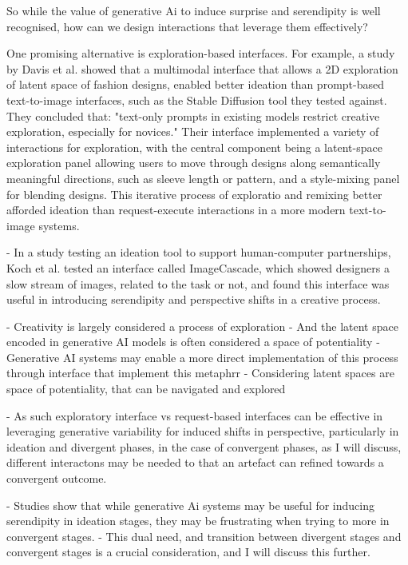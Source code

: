 So while the value of generative Ai to induce surprise and serendipity is well recognised, how can we design interactions that leverage them effectively? 

One promising alternative is exploration-based interfaces. For example, a study by Davis et al. \cite{Davis2024-ml} showed that a multimodal interface that allows a 2D exploration of latent space of fashion designs, enabled better ideation than prompt-based text-to-image interfaces, such as the Stable Diffusion tool they tested against. They concluded that: "text-only prompts in existing models restrict creative exploration, especially for novices." Their interface implemented a variety of interactions for exploration, with the central component being a latent-space exploration panel allowing users to move through designs along semantically meaningful directions, such as sleeve length or pattern, and a style-mixing panel for blending designs. This iterative process of exploratio and remixing better afforded ideation than request-execute interactions in a more modern text-to-image systems. 

- In a study testing an ideation tool to support human-computer partnerships, Koch et al. \cite{Koch2020-gx} tested an interface called ImageCascade, which showed designers a slow stream of images, related to the task or not, and found this interface was useful in introducing serendipity and perspective shifts in a creative process. 


- Creativity is largely considered a process of exploration \cite{Boden1998-yn, Wiggins2019-yj}
- And the latent space encoded in generative AI models is often considered a space of potentiality \cite{Schaerf2024-gf}
- Generative AI systems may enable a more direct implementation of this process through interface that implement this metaphrr
- Considering latent spaces are space of potentiality, that can be navigated and explored

- As such exploratory interface vs request-based interfaces can be effective in leveraging generative variability for induced shifts in perspective, particularly in ideation and divergent phases, in the case of convergent phases, as I will discuss, different interactons may be needed to that an artefact can refined towards a convergent outcome. 

- Studies show that while generative Ai systems may be useful for inducing serendipity in ideation stages, they may be frustrating when trying to more in convergent stages. 
- This dual need, and transition between divergent stages and convergent stages is a crucial consideration, and I will discuss this further. 



